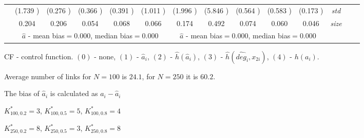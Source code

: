 \begin{table}
\begin{threeparttable}
{\begin{tabular}{|c|c|c|c|c|c|c|c|c|c|c|c|c|c|}
&(1.739 )&(0.276 )&(0.366 )&(0.391 )&(1.011 )&(1.996 )&(5.846 )&(0.564 )&(0.583 )&(0.173 )&\textit{std}\\ 
& 0.204 & 0.206 &0.054 &0.068 &0.066 &0.174& 0.492& 0.074 &0.060 &0.046 &\textit{size} \\\midrule 
&\multicolumn{5}{|c|}{$\hat{a}$ - mean bias$=$0.000, median bias$=$0.000 }&\multicolumn{5}{|c|}{$\hat{a}$ - mean bias$=$0.000, median bias$=$0.000 }&\\ \hline 
\end{tabular}} 
\begin{tablenotes}\tiny 
\item CF - control function. $(0)$ - none, $(1)$ - $\hat{a}_i$,  $(2)$ - $\hat{h}(\hat{a}_i)$, $(3)$ - $\hat{h}(\widehat{deg}_i,x_{2i})$, $(4)$ - $h(a_i)$. 
\item Average number of links for $N=100$ is $24.1$, for $N=250$ it is $60.2$. 
\item The bias of $\hat{a}_i$ is calculated as $a_i-\hat{a}_i$ 
\item $K^*_{100,0.2}=3$, $K^*_{100,0.5}=5$, $K^*_{100,0.8}=4$ 
\item $K^*_{250,0.2}=8$, $K^*_{250,0.5}=3$, $K^*_{250,0.8}=8$ 
  \end{tablenotes} 
\end{threeparttable} 
\end{table} 
